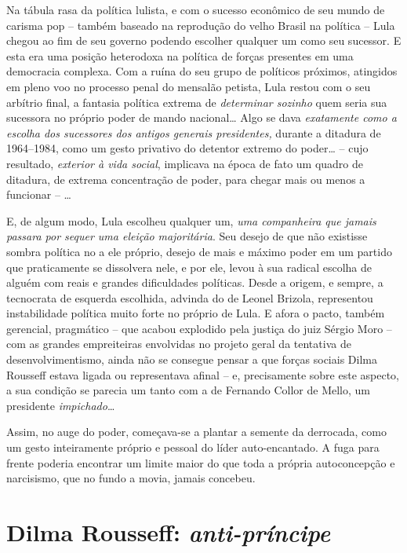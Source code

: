 Na tábula rasa da política lulista, e com o sucesso econômico de seu
mundo de carisma pop -- também baseado na reprodução do velho Brasil na
política -- Lula chegou ao fim de seu governo podendo escolher qualquer
um como seu sucessor. E esta era uma posição heterodoxa na política de
forças presentes em uma democracia complexa. Com a ruína do seu grupo de
políticos próximos, atingidos em pleno voo no processo penal do mensalão
petista, Lula restou com o seu arbítrio final, a fantasia política
extrema de \emph{determinar sozinho} quem seria sua sucessora no próprio
poder de mando nacional… Algo se dava \emph{exatamente como a escolha
dos sucessores dos antigos generais presidentes,} durante a ditadura de
1964--1984, como um gesto privativo do detentor extremo do poder… --
cujo resultado, \emph{exterior à vida social}, implicava na época de
fato um quadro de ditadura, de extrema concentração de poder, para
chegar mais ou menos a funcionar -- …

E, de algum modo, Lula escolheu qualquer um, \emph{uma companheira que
jamais passara por sequer uma eleição} \emph{majoritária}. Seu desejo de
que não existisse sombra política no  a ele próprio, desejo de mais e
máximo poder em um partido que praticamente se dissolvera nele, e por
ele, levou à sua radical escolha de alguém com reais e grandes
dificuldades políticas. Desde a origem, e sempre, a tecnocrata de
esquerda escolhida, advinda do  de Leonel Brizola, representou
instabilidade política muito forte no próprio  de Lula. E afora o
pacto, também gerencial, pragmático -- que acabou explodido pela justiça
do juiz Sérgio Moro -- com as grandes empreiteiras envolvidas no projeto
geral da tentativa de desenvolvimentismo, ainda não se consegue pensar a
que forças sociais Dilma Rousseff estava ligada ou representava afinal
-- e, precisamente sobre este aspecto, a sua condição se parecia um
tanto com a de Fernando Collor de Mello, um presidente
\emph{impichado}…

Assim, no auge do poder, começava-se a plantar a semente da derrocada,
como um gesto inteiramente próprio e pessoal do líder auto-encantado. A
fuga para frente poderia encontrar um limite maior do que toda a própria
autoconcepção e narcisismo, que no fundo a movia, jamais concebeu.

  \section{Dilma Rousseff:
  \emph{anti-príncipe}}\label{dilma-rousseff-anti-pruxedncipe}

